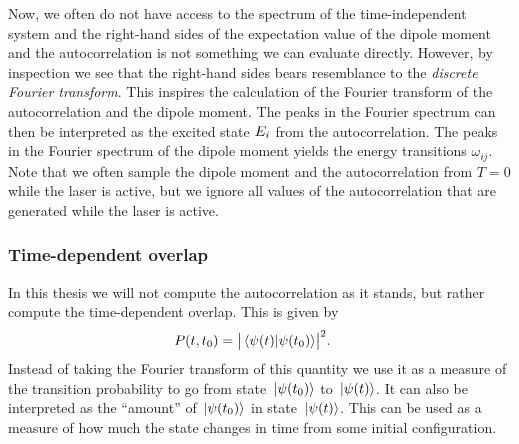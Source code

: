                 Now, we often do not have access to the spectrum of the
                time-independent system and the right-hand sides of the
                expectation value of the dipole moment and the autocorrelation
                is not something we can evaluate directly.
                However, by inspection we see that the right-hand sides bears
                resemblance to the \emph{discrete Fourier transform}.
                This inspires the calculation of the Fourier transform of the
                autocorrelation and the dipole moment.
                The peaks in the Fourier spectrum can then be interpreted as the
                excited state $E_i$ from the autocorrelation.
                The peaks in the Fourier spectrum of the dipole moment yields
                the energy transitions $\omega_{ij}$.
                Note that we often sample the dipole moment and the
                autocorrelation from $T = 0$ while the laser is active, but we
                ignore all values of the autocorrelation that are generated
                while the laser is active.

            \subsubsection{Time-dependent overlap}
                In this thesis we will not compute the autocorrelation as it
                stands, but rather compute the time-dependent overlap.
                This is given by
                \begin{align}
                    P(t, t_0)
                    &= \abs{\braket*{\psi(t)}{\psi(t_0)}}^2.
                \end{align}
                Instead of taking the Fourier transform of this quantity we use
                it as a measure of the transition probability to go from state
                $\ket*{\psi(t_0)}$ to $\ket*{\psi(t)}$.
                It can also be interpreted as the ``amount'' of
                $\ket*{\psi(t_0)}$ in state $\ket*{\psi(t)}$.
                This can be used as a measure of how much the state changes in
                time from some initial configuration.


